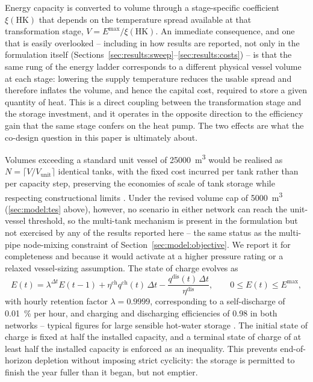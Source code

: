 \documentclass[review,3p]{elsarticle}
\begin{document}
Energy capacity is converted to volume through a stage-specific
coefficient $\xi(\mathrm{HK})$ that depends on the temperature spread
available at that transformation stage, $V = E^{\max} / \xi(\mathrm{HK})$.
An immediate consequence, and one that is easily overlooked -- including
in how results are reported, not only in the formulation itself
(Sections~\ref{sec:results:sweep}--\ref{sec:results:costs}) -- is that
the same rung of the energy ladder corresponds to a different physical
vessel volume at each stage: lowering the supply temperature reduces the
usable spread and therefore inflates the volume, and hence the capital
cost, required to store a given quantity of heat. This is a direct
coupling between the transformation stage and the storage investment,
and it operates in the opposite direction to the efficiency gain that
the same stage confers on the heat pump. The two effects are what the
co-design question in this paper is ultimately about.

Volumes exceeding a standard unit vessel of \SI{25000}{\cubic\metre}
would be realised as $N = \lceil V / V_{\mathrm{unit}} \rceil$ identical
tanks, with the fixed cost incurred per tank rather than per capacity
step, preserving the economies of scale of tank storage while respecting
constructional limits \cite{Dahash.2021}. Under the revised volume cap
of \SI{5000}{\cubic\metre} (\cref{sec:model:tes} above), however, no
scenario in either network can reach the unit-vessel threshold, so the
multi-tank mechanism is present in the formulation but not exercised by
any of the results reported here -- the same status as the multi-pipe
node-mixing constraint of Section~\ref{sec:model:objective}. We report
it for completeness and because it would activate at a higher pressure
rating or a relaxed vessel-sizing assumption. The state of charge
evolves as
\begin{equation}
\label{eq:soc}
E(t) = \lambda^{\Delta t} E(t-1)
 + \eta^{\mathrm{ch}} q^{\mathrm{ch}}(t)\,\Delta t
 - \frac{q^{\mathrm{dis}}(t)\,\Delta t}{\eta^{\mathrm{dis}}},
\qquad 0 \le E(t) \le E^{\max},
\end{equation}
with hourly retention factor $\lambda = \num{0.9999}$, corresponding to a
self-discharge of \SI{0.01}{\percent} per hour, and charging and
discharging efficiencies of \num{0.98} in both networks -- typical
figures for large sensible hot-water storage
\cite{Dahash.2021,DEA.2024b}. The initial
state of charge is fixed at half the installed capacity, and a terminal
state of charge of at least half the installed capacity is enforced as an
inequality. This prevents end-of-horizon depletion without imposing
strict cyclicity: the storage is permitted to finish the year fuller than
it began, but not emptier.
\end{document}

